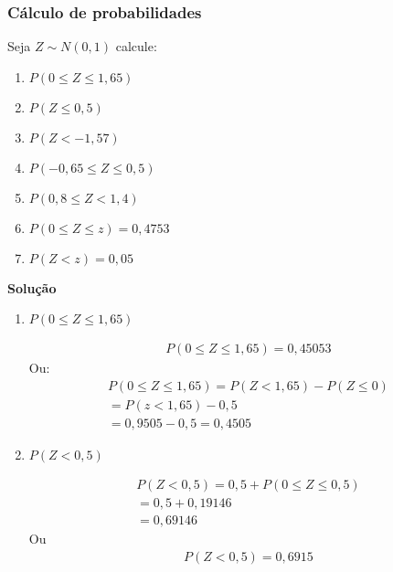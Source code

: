   \subsubsection{Cálculo de probabilidades}
    \begin{example}
      Seja $Z\sim N(0,1)$ calcule:
      \begin{enumerate}[label=(\alph*)]
        \item $P(0 \leq Z \leq 1,65)$
        \item $P(Z \leq 0,5)$
        \item $P(Z < -1,57)$
        \item $P(-0,65 \leq Z \leq 0,5)$
        \item $P(0,8 \leq Z < 1,4)$
        \item $P(0 \leq Z \leq z)=0,4753$
        \item $P(Z < z)=0,05$
      \end{enumerate}

      \textbf{Solução}
      \begin{enumerate}[label=(\alph*)]
        \item $P(0 \leq Z \leq 1,65)$
          \begin{figure}[H]
            \centering
            
          \end{figure}
        \begin{align*}          P(0 \leq Z \leq 1,65)= 0,45053 \end{align*}
          Ou:
          \begin{align*}
            P(0 \leq Z \leq 1,65)= P(Z < 1,65)-P(Z \leq 0) \\
            = P(z < 1,65)- 0,5 \\
            = 0,9505 - 0,5 = 0,4505
          \end{align*}
        \item $P(Z < 0,5)$

          \begin{figure}[H]
            \centering
            
          \end{figure}

          \begin{align*}
            P(Z < 0,5)= 0,5 + P(0 \leq Z \leq 0,5) \\
            = 0,5 + 0,19146 \\
            = 0,69146
          \end{align*}
          Ou 
          \begin{align*}
            P(Z <0,5) = 0,6915
          \end{align*}


\end{enumerate}
\end{example}
